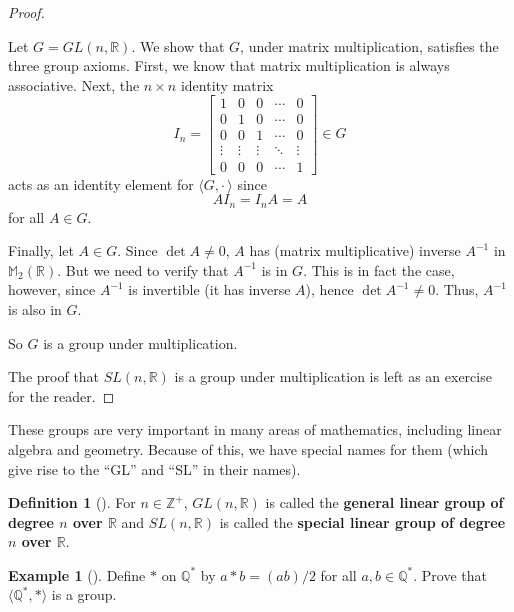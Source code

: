 \documentclass[10pt,]{book}
\newcommand{\terminology}[1]{\textbf{#1}}
\theoremstyle{plain}
\theoremstyle{definition}
\newtheorem{definition}[theorem]{Definition}
\theoremstyle{definition}
\theoremstyle{definition}
\newtheorem{example}[theorem]{Example}
\theoremstyle{definition}
\numberwithin{equation}{section}
\def\Z{\mathbb{Z}}
\def\R{\mathbb{R}}
\def\Q{\mathbb{Q}}
\def\M{\mathbb{M}}
\newcommand{\amp}{&}
\begin{document}
\begin{proof}\hypertarget{proof-8}{}
Let \(G=GL(n,\R)\). We show that \(G\), under matrix multiplication, satisfies the three group axioms. First, we know that matrix multiplication is always associative. Next, the \(n\times n\) identity matrix%
\begin{equation*}
I_n=\begin{bmatrix}1 \amp  0 \amp  0 \amp  \cdots \amp  0 \\
0 \amp  1 \amp  0 \amp  \cdots \amp  0 \\
0 \amp  0 \amp  1 \amp  \cdots \amp  0 \\
\vdots \amp  \vdots \amp  \vdots \amp  \ddots \amp  \vdots \\
0 \amp  0 \amp  0 \amp  \cdots \amp  1
\end{bmatrix}  \in G
\end{equation*}
acts as an identity element for \(\langle G, \cdot\,\rangle\) since%
\begin{equation*}
AI_n=I_nA = A
\end{equation*}
for all \(A\in G\).%
\par
Finally, let \(A\in G\).  Since \(\det A\neq 0\), \(A\) has (matrix multiplicative) inverse \(A^{-1}\) in \(\M_2(\R)\). But we need to verify that \(A^{-1}\) is in \(G\). This is in fact the case, however, since \(A^{-1}\) is invertible (it has inverse \(A\)), hence \(\det
A^{-1} \neq 0\).  Thus, \(A^{-1}\) is also in \(G\).%
\par
So \(G\) is a group under multiplication.%
\par
The proof that \(SL(n,\R)\) is a group under multiplication is left as an exercise for the reader.%
\end{proof}
These groups are very important in many areas of mathematics, including linear algebra and geometry. Because of this, we have special names for them (which give rise to the ``GL'' and ``SL'' in their names).%
\begin{definition}[{}]\label{definition-21}
For \(n\in \Z^+\), \(GL(n,\R)\) is called the \terminology{general linear group of degree \(n\) over \(\R\)} and \(SL(n,\R)\) is called the \terminology{special linear group of degree \(n\) over \(\R\)}.%
\end{definition}
\begin{example}[]\label{example-12}
Define \(*\) on \(\Q^*\) by \(a*b=(ab)/2\) for all \(a,b\in \Q^*\). Prove that \(\langle \Q^*,*\rangle\) is a group.%
\end{example}
\typeout{************************************************}
\typeout{************************************************}
\end{document}
